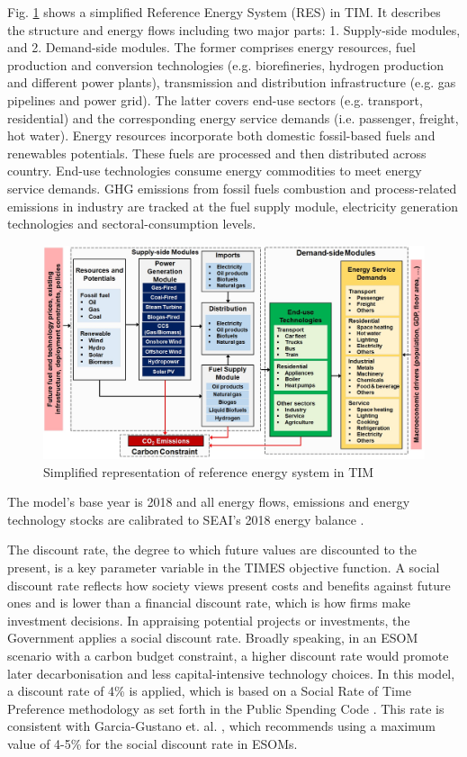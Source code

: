 \documentclass[journal abbreviation, manuscript]{copernicus}
\begin{document}
Fig. \ref{fig:TIM-RES} shows a simplified Reference Energy System (RES) in TIM. It describes the structure and energy flows including two major parts: 1. Supply-side modules, and 2. Demand-side modules. The former comprises energy resources, fuel production and conversion technologies (e.g. biorefineries, hydrogen production and different power plants), transmission and distribution infrastructure (e.g. gas pipelines and power grid). The latter covers end-use sectors (e.g. transport, residential) and the corresponding energy service demands (i.e. passenger, freight, hot water). Energy resources incorporate both domestic fossil-based fuels and renewables potentials. These fuels are processed and then distributed across country. End-use technologies consume energy commodities to meet energy service demands. GHG emissions from fossil fuels combustion and process-related emissions in industry are tracked at the fuel supply module, electricity generation technologies and sectoral-consumption levels. 

\begin{figure}[h!]
 \centering
 \includegraphics[scale=0.48]{TIM_RES.jpg} 
 \caption{Simplified representation of reference energy system in TIM}
 \label{fig:TIM-RES}
\end{figure}

The model's base year is 2018 and all energy flows, emissions and energy technology stocks are calibrated to SEAI's 2018 energy balance \cite{SEAI2019}.

The discount rate, the degree to which future values are discounted to the present, is a key parameter variable in the TIMES objective function. A social discount rate reflects how society views present costs and benefits against future ones and is lower than a financial discount rate, which is how firms make investment decisions. In appraising potential projects or investments, the Government applies a social discount rate. Broadly speaking, in an ESOM scenario with a carbon budget constraint, a higher discount rate would promote later decarbonisation and less capital-intensive technology choices. In this model, a discount rate of 4\% is applied, which is based on a Social Rate of Time Preference methodology as set forth in the Public Spending Code \cite{OCallaghan2018}. This rate is consistent with Garcia-Gustano et. al. \cite{Garcia-Gusano2016}, which recommends using a maximum value of 4-5\% for the social discount rate in ESOMs. 
\end{document}
